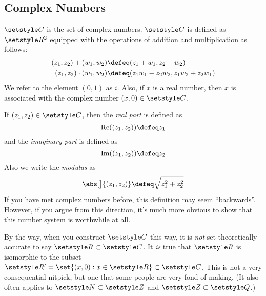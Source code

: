 \subsection{Complex Numbers}

\(\Complex\) is the set of complex numbers. \(\Complex\) is defined as
\(\Reals^2\) equipped with the operations of addition and multiplication as
follows:
\begin{align*}
 (z_1, z_2) + (w_1, w_2) &\defeq (z_1 + w_1, z_2 + w_2) \\
 (z_1, z_2) \cdot (w_1, w_2) &\defeq (z_1 w_1 - z_2 w_2, z_1 w_2 + z_2 w_1)
\end{align*}
We refer to the element \((0, 1)\) as \(i\). Also, if \(x\) is a real number,
then \(x\) is associated with the complex number \((x, 0) \in \Complex\).

If
\((z_1, z_2) \in \Complex\), then the \emph{real part} is defined as
\begin{equation*}
 \Re((z_1, z_2)) \defeq z_1
\end{equation*}
and the \emph{imaginary part} is defined as
\begin{equation*}
 \Im((z_1, z_2)) \defeq z_2
\end{equation*}
Also we write the \emph{modulus} as
\begin{equation*}
 \abs[\big]{(z_1, z_2)} \defeq \sqrt{z_1^2 + z_2^2}
\end{equation*}
If you have met complex numbers before, this definition may seem ``backwards''.
However, if you argue from this direction, it's much more obvious to show that
this number system is worthwhile at all.

By the way, when you construct \(\Complex\) this way, it is \emph{not}
set-theoretically accurate to say \(\Reals \subset \Complex\). It \emph{is} true
that \(\Reals\) is isomorphic to the subset
\(\Reals' = \set{(x, 0) : x \in \Reals} \subset \Complex\). This is not a very
consequential nitpick, but one that some people are very fond of making. (It also
often applies to \(\Naturals \subset \Integers\) and
\(\Integers \subset \Rationals\).)
